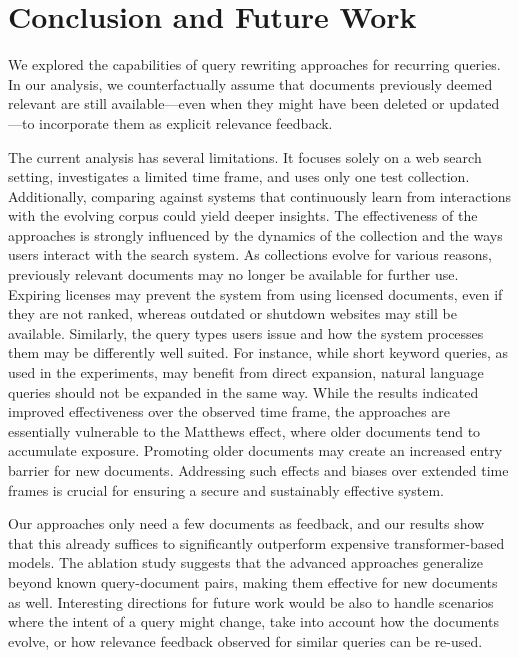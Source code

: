 \section{Conclusion and Future Work}
We explored the capabilities of query rewriting approaches for recurring queries. In our analysis, we counterfactually assume that documents previously deemed relevant are still available---even when they might have been deleted or updated---to incorporate them as explicit relevance feedback. 

The current analysis has several limitations. It focuses solely on a web search setting, investigates a limited time frame, and uses only one test collection. Additionally, comparing against systems that continuously learn from interactions with the evolving corpus could yield deeper insights. 
The effectiveness of the approaches is strongly influenced by the dynamics of the collection and the ways users interact with the search system. As collections evolve for various reasons, previously relevant documents may no longer be available for further use. Expiring licenses may prevent the system from using licensed documents, even if they are not ranked, whereas outdated or shutdown websites may still be available. Similarly, the query types users issue and how the system processes them may be differently well suited. For instance, while short keyword queries, as used in the experiments, may benefit from direct expansion, natural language queries should not be expanded in the same way.
While the results indicated improved effectiveness over the observed time frame, the approaches are essentially vulnerable to the Matthews effect, where older documents tend to accumulate exposure. Promoting older documents may create an increased entry barrier for new documents. Addressing such effects and biases over extended time frames is crucial for ensuring a secure and sustainably effective system. 

Our approaches only need a few documents as feedback, and our results show that this already suffices to significantly outperform expensive transformer-based models. The ablation study suggests that the advanced approaches generalize beyond known query-document pairs, making them effective for new documents as well.
Interesting directions for future work would be also to handle scenarios where the intent of a query might change, take into account how the documents evolve, or how relevance feedback observed for similar queries can be re-used.

